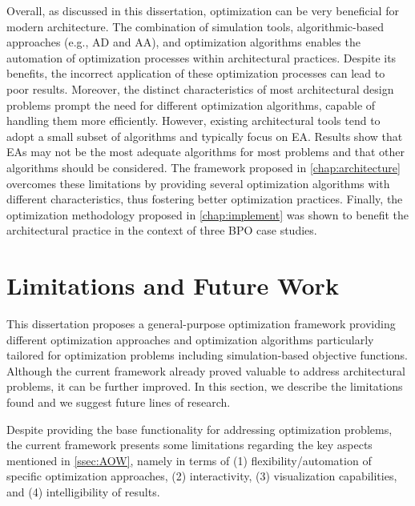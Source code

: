 Overall, as discussed in this dissertation, optimization can be very beneficial for modern architecture. The combination of simulation tools, algorithmic-based approaches (e.g., \ac{AD} and \ac{AA}), and optimization algorithms enables the automation of optimization processes within architectural practices. Despite its benefits, the incorrect application of these optimization processes can lead to poor results. Moreover, the distinct characteristics of most architectural design problems prompt the need for different optimization algorithms, capable of handling them more efficiently. However, existing architectural tools tend to adopt a small subset of algorithms and typically focus on \ac{EA}. Results show that \acp{EA} may not be the most adequate algorithms for most problems and that other algorithms should be considered. The framework proposed in \cref{chap:architecture} overcomes these limitations by providing several optimization algorithms with different characteristics, thus fostering better optimization practices. Finally, the optimization methodology proposed in \cref{chap:implement} was shown to benefit the architectural practice in the context of three \ac{BPO} case studies.
	
\section{Limitations and Future Work}
This dissertation proposes a general-purpose optimization framework providing different optimization approaches and optimization algorithms particularly tailored for optimization problems including simulation-based objective functions. Although the current framework already proved valuable to address architectural problems, it can be further improved. In this section, we describe the limitations found and we suggest future lines of research.

Despite providing the base functionality for addressing optimization problems, the current framework presents some limitations regarding the key aspects mentioned in \cref{ssec:AOW}, namely in terms of (1) flexibility/automation of specific optimization approaches, (2) interactivity, (3) visualization capabilities, and (4) intelligibility of results.

